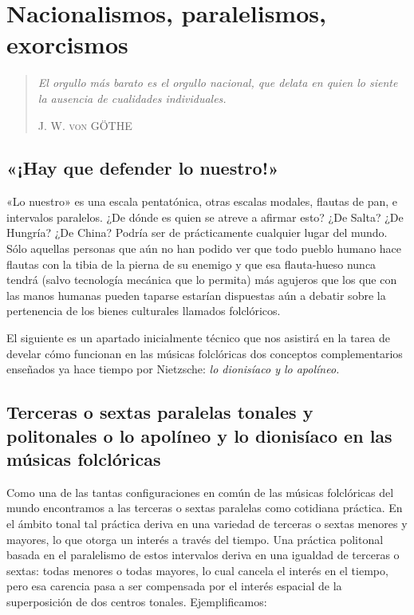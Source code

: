 \chapter{Nacionalismos, paralelismos, exorcismos}
\begin {quotation}
\begin {flushright}
\begin {minipage}{6cm}
\emph{El orgullo más barato es el orgullo nacional, que delata en quien lo siente la ausencia de cualidades individuales.}
\begin {flushright}
\textsc{J. W. von GÖTHE}
\end{flushright}
\end {minipage}
\end {flushright}
\end {quotation}
\section{«¡Hay que defender lo nuestro!»}
«Lo nuestro» es una escala pentatónica, otras escalas modales, flautas de pan, e intervalos paralelos. ¿De dónde es quien se atreve a afirmar esto? ¿De Salta? ¿De Hungría? ¿De China? Podría ser de prácticamente cualquier lugar del mundo. Sólo aquellas personas que aún no han podido ver que todo pueblo humano hace flautas con la tibia de la pierna de su enemigo y que esa flauta-hueso nunca tendrá (salvo tecnología mecánica que lo permita) más agujeros que los que con las manos humanas pueden taparse estarían dispuestas aún a debatir sobre la pertenencia de los bienes culturales llamados folclóricos.

El siguiente es un apartado inicialmente técnico que nos asistirá en la tarea de develar cómo funcionan en las músicas folclóricas dos conceptos complementarios enseñados ya hace tiempo por Nietzsche: \emph{lo dionisíaco y lo apolíneo.}
\section{Terceras o sextas paralelas tonales y politonales o lo apolíneo y lo dionisíaco en las músicas folclóricas}
Como una de las tantas configuraciones en común de las músicas folclóricas del mundo encontramos a las terceras o sextas paralelas como cotidiana práctica. En el ámbito tonal tal práctica deriva en una variedad de terceras o sextas menores y mayores, lo que otorga un interés a través del tiempo. Una práctica politonal basada en el paralelismo de estos intervalos deriva en una igualdad de terceras o sextas: todas menores o todas mayores, lo cual cancela el interés en el tiempo, pero esa carencia pasa a ser compensada por el interés espacial de la superposición de dos centros tonales. Ejemplificamos:

